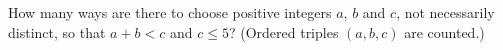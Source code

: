 How many ways are there to choose positive integers $a$, $b$ and $c$, not necessarily distinct, so that $a+b<c$ and $c\le5$? (Ordered triples $(a,b,c)$ are counted.)
